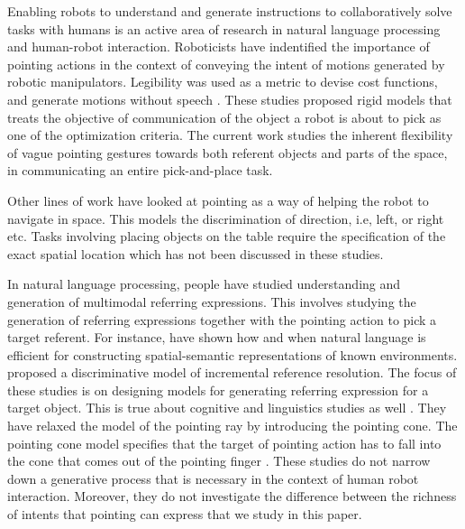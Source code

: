 

Enabling robots to understand and generate instructions to collaboratively solve tasks with humans is an active area of research in natural language processing and human-robot interaction.
Roboticists have indentified the importance of pointing actions in the context of conveying the intent of motions generated by robotic manipulators. Legibility was used as a metric to devise cost functions, and generate motions without speech \cite{zhao2016experimental,holladay2014legible}.
These studies proposed rigid models that treats the objective of communication of the object a robot is about to pick as one of the optimization criteria.
The current work studies the inherent flexibility of vague pointing gestures towards both referent objects and parts of the space, in communicating an entire pick-and-place task.

Other lines of work have looked at pointing as a way of helping the robot to navigate in space. This models the discrimination of direction, i.e, left, or right etc. Tasks involving placing objects on the table require the specification of the exact spatial location which has not been discussed in these studies. \cite{mei2016listen,tellex2011understanding}


In natural language processing, people have studied understanding and generation of multimodal referring expressions. This involves studying the generation of referring expressions together with the pointing action to pick a target referent. For instance,  \cite{kollar2014grounding,han2018placing} have shown how and when natural language is efficient for constructing spatial-semantic representations of known environments. \cite{kennington2013interpreting} proposed a discriminative model of incremental reference resolution. The focus of these studies is on designing models for generating referring expression for a target object. 
This is true about cognitive and linguistics studies as well \cite{kita2003pointing,kita2003interplay,clark2003pointing,goodwin2003pointing}.
They have relaxed the model of the pointing ray by introducing the pointing cone. 
The pointing cone model specifies that the target of pointing action has to fall into the cone that comes out of the pointing finger \cite{rieser2004pointing,kranstedt2003deixis}. These studies do not narrow down a generative process that is necessary in the context of human robot interaction. Moreover, they do not investigate the difference between the richness of intents that pointing can express that we study in this paper.

